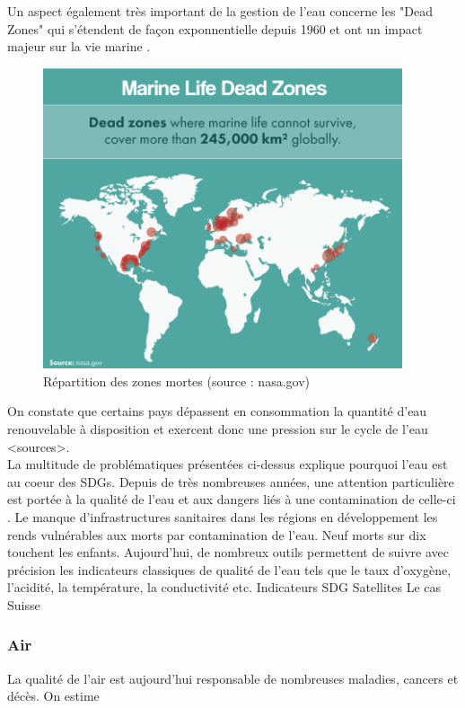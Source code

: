 \documentclass[10pt, conference, compsocconf]{llncs}
\begin{document}
			Un aspect également très important de la gestion de l'eau concerne les "Dead Zones" qui s'étendent de façon exponnentielle depuis 1960 et ont un impact majeur sur la vie marine \cite{diaz_spreading_2008}. \\
			\begin{figure}
				\begin{center}
					\includegraphics[width=300pt]{marine-life-dead-zones.png}
				\end{center}
				\caption{Répartition des zones mortes (source : nasa.gov)}
			\end{figure}
		
			On constate que certains pays dépassent en consommation la quantité d'eau renouvelable à disposition et exercent donc une pression sur le cycle de l'eau <sources>. \\
			La multitude de problématiques présentées ci-dessus explique pourquoi l'eau est au coeur des SDGs. Depuis de très nombreuses années, une attention particulière est portée à la qualité de l'eau et aux dangers liés à une contamination de celle-ci \cite{ashbolt_microbial_2004}. Le manque d'infrastructures sanitaires dans les régions en développement les rends vulnérables aux morts par contamination de l'eau. Neuf morts sur dix touchent les enfants. Aujourd'hui, de nombreux outils permettent de suivre avec précision les indicateurs classiques de qualité de l'eau tels que le taux d'oxygène, l'acidité, la température, la conductivité etc.
			Indicateurs SDG
			Satellites
			Le cas Suisse
		
		\subsubsection{Air}
			La qualité de l'air est aujourd'hui responsable de nombreuses maladies, cancers et décès. On estime
\end{document}
